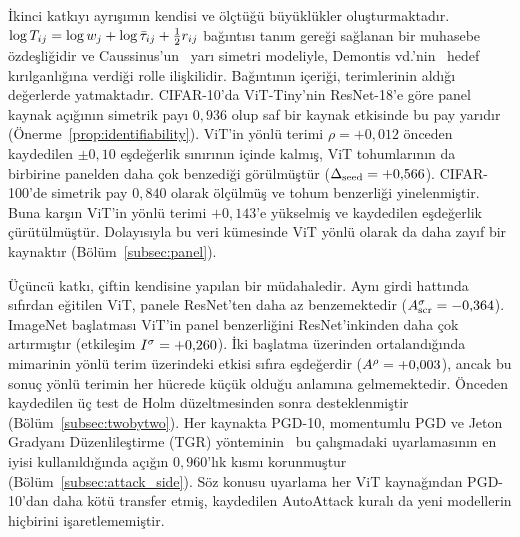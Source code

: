 İkinci katkıyı ayrışımın kendisi ve ölçtüğü büyüklükler oluşturmaktadır. $\log T_{ij} = \log w_j + \log\bar{\tau}_{ij} + \tfrac{1}{2} r_{ij}$ bağıntısı tanım gereği sağlanan bir muhasebe özdeşliğidir ve Caussinus'un~\cite{caussinus1965contribution} yarı simetri modeliyle, Demontis vd.'nin~\cite{demontis2019adversarial} hedef kırılganlığına verdiği rolle ilişkilidir. Bağıntının içeriği, terimlerinin aldığı değerlerde yatmaktadır. CIFAR-10'da ViT-Tiny'nin ResNet-18'e göre panel kaynak açığının simetrik payı $0{,}936$ olup saf bir kaynak etkisinde bu pay yarıdır (Önerme~\ref{prop:identifiability}). ViT'in yönlü terimi $\rho = +0{,}012$ önceden kaydedilen $\pm0{,}10$ eşdeğerlik sınırının içinde kalmış, ViT tohumlarının da birbirine panelden daha çok benzediği görülmüştür ($\Delta_{\mathrm{seed}} = +0{,}566$). CIFAR-100'de simetrik pay $0{,}840$ olarak ölçülmüş ve tohum benzerliği yinelenmiştir. Buna karşın ViT'in yönlü terimi $+0{,}143$'e yükselmiş ve kaydedilen eşdeğerlik çürütülmüştür. Dolayısıyla bu veri kümesinde ViT yönlü olarak da daha zayıf bir kaynaktır (Bölüm~\ref{subsec:panel}).

Üçüncü katkı, çiftin kendisine yapılan bir müdahaledir. Aynı girdi hattında sıfırdan eğitilen ViT, panele ResNet'ten daha az benzemektedir ($A^{\sigma}_{\mathrm{scr}} = -0{,}364$). ImageNet başlatması ViT'in panel benzerliğini ResNet'inkinden daha çok artırmıştır (etkileşim $I^{\sigma} = +0{,}260$). İki başlatma üzerinden ortalandığında mimarinin yönlü terim üzerindeki etkisi sıfıra eşdeğerdir ($A^{\rho} = +0{,}003$), ancak bu sonuç yönlü terimin her hücrede küçük olduğu anlamına gelmemektedir. Önceden kaydedilen üç test de Holm düzeltmesinden sonra desteklenmiştir (Bölüm~\ref{subsec:twobytwo}). Her kaynakta PGD-10, momentumlu PGD ve Jeton Gradyanı Düzenlileştirme (TGR) yönteminin~\cite{zhang2023tgr} bu çalışmadaki uyarlamasının en iyisi kullanıldığında açığın $0{,}960$'lık kısmı korunmuştur (Bölüm~\ref{subsec:attack_side}). Söz konusu uyarlama her ViT kaynağından PGD-10'dan daha kötü transfer etmiş, kaydedilen AutoAttack kuralı da yeni modellerin hiçbirini işaretlememiştir.

